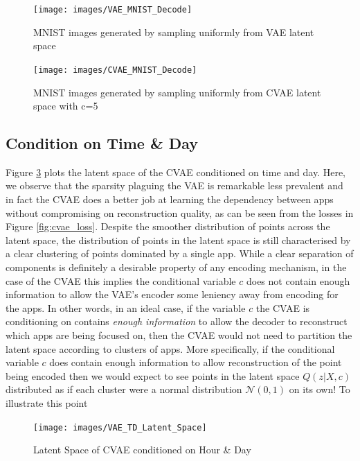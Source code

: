 \begin{figure}[htbp]
    \centering
    \texttt{[image: images/VAE\_MNIST\_Decode]}
    \caption{MNIST images generated by sampling uniformly from VAE latent space}
    \label{fig:mnist_decode}
\end{figure}

\begin{figure}[htbp]
    \centering
    \texttt{[image: images/CVAE\_MNIST\_Decode]}
    \caption{MNIST images generated by sampling uniformly from CVAE latent space with c=5}
    \label{fig:cmnist_decode}
\end{figure}

\subsection{Condition on Time \& Day}

Figure \ref{fig:cvae_latent} plots the latent space of the CVAE conditioned on time and day. Here, we observe that the sparsity plaguing the VAE is remarkable less prevalent and in fact the CVAE does a better job at learning the dependency between apps without compromising on reconstruction quality, as can be seen from the losses in Figure \ref{fig:cvae_loss}. Despite the smoother distribution of points across the latent space, the distribution of points in the latent space is still characterised by a clear clustering of points dominated by a single app. While a clear separation of components is definitely a desirable property of any encoding mechanism, in the case of the CVAE this implies the conditional variable $c$ does not contain enough information to allow the VAE's encoder some leniency away from encoding for the apps. In other words, in an ideal case, if the variable $c$ the CVAE is conditioning on contains \textit{enough information} to allow the decoder to reconstruct which apps are being focused on, then the CVAE would not need to partition the latent space according to clusters of apps. More specifically, if the conditional variable $c$ does contain enough information to allow reconstruction of the point being encoded then we would expect to see points in the latent space $Q(z|X,c)$ distributed as if each cluster were a normal distribution $\mathcal{N}(0,1)$ on its own! To illustrate this point

 \begin{figure}[htbp]
     \centering
     \texttt{[image: images/VAE\_TD\_Latent\_Space]}
     \caption{Latent Space of CVAE conditioned on Hour \& Day}
     \label{fig:cvae_latent}
 \end{figure}

